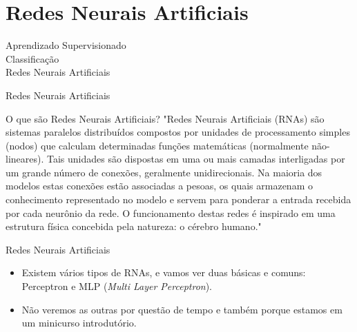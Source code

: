 \documentclass{libs/ufc_format}
\begin{document}
\section{Redes Neurais Artificiais}

\begin{frame}{}
    \centering
    \LARGE
    Aprendizado Supervisionado\\
    \vspace{0.5cm}
    \LARGE
    Classificação\\
    \vspace{0.5cm}
    \Large
    Redes Neurais Artificiais
\end{frame}

\begin{frame}{Redes Neurais Artificiais}
    \begin{block}{O que são Redes Neurais Artificiais?}
        \justifying
        "Redes Neurais Artificiais (RNAs) são sistemas paralelos distribuídos compostos por unidades de processamento simples (nodos) que calculam determinadas funções matemáticas (normalmente não-lineares). Tais unidades são dispostas em uma ou mais camadas interligadas por um grande número de conexões, geralmente unidirecionais. Na maioria dos modelos estas conexões estão associadas a pesoas, os quais armazenam o conhecimento representado no modelo e servem para ponderar a entrada recebida por cada neurônio da rede. O funcionamento destas redes é inspirado em uma estrutura física concebida pela natureza: o cérebro humano." \cite{blc00}
    \end{block}
\end{frame}

\begin{frame}{Redes Neurais Artificiais}
    \begin{itemize}
        \justifying
        \item Existem vários tipos de RNAs, e vamos ver duas básicas e comuns: Perceptron e MLP (\textit{Multi Layer Perceptron}).
        \item<2-> Não veremos as outras por questão de tempo e também porque estamos em um minicurso introdutório.
    \end{itemize}
\end{frame}

\end{document}
